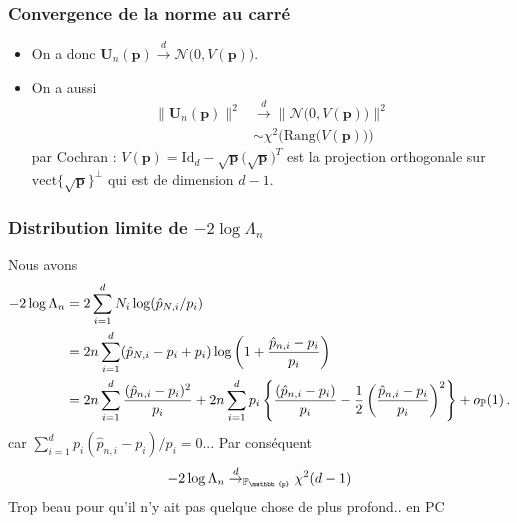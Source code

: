 \begin{frame}
\frametitle{Convergence de la norme au carré}
\begin{itemize}
\item On a donc ${\boldsymbol U}_n(\boldsymbol{p}) \stackrel{d}{\longrightarrow} {\mathcal N}\big(0,V(\boldsymbol{p})\big)$.
\item On a aussi
\begin{align*}
\|{\boldsymbol U}_n(\boldsymbol{p}) \|^2 & \stackrel{d}{\longrightarrow} \| {\mathcal N}\big(0,V(\boldsymbol{p})\big)\|^2 \\
& \sim \chi^2\big(\mathrm{Rang}\big(V(\boldsymbol{p})\big)\big)
\end{align*}
par \alert{Cochran} :  $V(\boldsymbol{p}) = \mathrm{Id}_d-\sqrt{\boldsymbol{p}}\big(\sqrt{\boldsymbol{p}}\big)^T$ est la projection orthogonale sur $\mathrm{vect}\{\sqrt{\boldsymbol{p}}\}^\perp$ qui est de dimension $d-1$.
\end{itemize}
\end{frame}


\begin{frame}
\frametitle{Distribution limite de $-2 \log \Lambda_n$}
Nous avons
\begin{align*}
-2 \log \Lambda_n &= 2\sum_{i=1}^d N_i \log( \hat{p}_{N,i}/p_i) \\
                  &= 2 n \sum_{i=1}^d  (\hat{p}_{N,i} - p_i + p_i) \log\left( 1 + \frac{\hat{p}_{n,i}-p_i}{p_i} \right) \\
                  &= 2 n \sum_{i=1}^d \frac{(\hat{p}_{n,i}-p_i)^2}{p_i} + 2 n \sum_{i=1}^d p_i \left\{ \frac{(\hat{p}_{n,i}-p_i)}{p_i} - \frac{1}{2} \left(\frac{\hat{p}_{n,i}-p_i}{p_i} \right)^2 \right\} + o_{\operatorname{{\mathbb P}}}(1) \,.
\end{align*}
car $\sum_{i=1}^d p_i (\hat{p}_{n,i} - p_i)/p_i= 0$... Par conséquent 
\alert{
\[
-2 \log \Lambda_n \dlim_{\PP_{\mathbb{p}}} \chi^2(d-1) 
\]
}
Trop beau pour qu'il n'y ait pas quelque chose de plus profond.. en PC
\end{frame}

